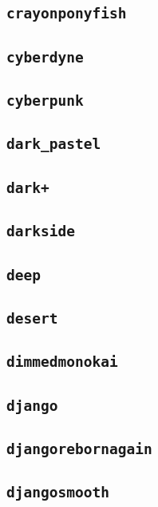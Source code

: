 \subsection{\texttt{crayonponyfish}}
\newpage
\subsection{\texttt{cyberdyne}}
\newpage
\subsection{\texttt{cyberpunk}}
\newpage
\subsection{\texttt{dark\_pastel}}
\newpage
\subsection{\texttt{dark+}}
\newpage
\subsection{\texttt{darkside}}
\newpage
\subsection{\texttt{deep}}
\newpage
\subsection{\texttt{desert}}
\newpage
\subsection{\texttt{dimmedmonokai}}
\newpage
\subsection{\texttt{django}}
\newpage
\subsection{\texttt{djangorebornagain}}
\newpage
\subsection{\texttt{djangosmooth}}
\newpage
